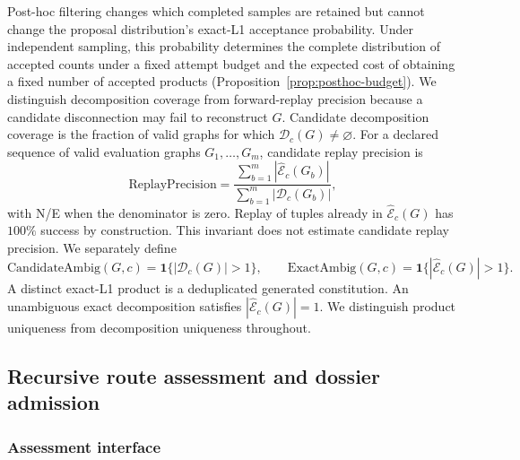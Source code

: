 \documentclass{article}
\theoremstyle{definition}
\begin{document}
Post-hoc filtering changes which completed samples are retained but cannot change the proposal
distribution's exact-L1 acceptance probability.
Under independent sampling, this probability determines the complete distribution of accepted
counts under a fixed attempt budget and the expected cost of obtaining a fixed number of accepted
products (Proposition~\ref{prop:posthoc-budget}).
We distinguish decomposition coverage from forward-replay precision because a candidate disconnection
may fail to reconstruct $G$.
Candidate decomposition coverage is the fraction of valid graphs for which
$\mathcal D_c(G)\neq\varnothing$. For a declared sequence of valid evaluation graphs $G_1,\ldots,G_m$, candidate replay precision is
\begin{equation}
 \mathrm{ReplayPrecision}
 =\frac{\sum_{b=1}^m|\widehat{\mathcal E}_c(G_b)|}
 {\sum_{b=1}^m|\mathcal D_c(G_b)|},
\end{equation}
with N/E when the denominator is zero. Replay of tuples already in
$\widehat{\mathcal E}_c(G)$ has $100\%$ success by construction. This invariant does not estimate
candidate replay precision. We separately define
\begin{equation}
 \mathrm{CandidateAmbig}(G,c)=\mathbf 1\{|\mathcal D_c(G)|>1\},\qquad
 \mathrm{ExactAmbig}(G,c)=\mathbf 1\{|\widehat{\mathcal E}_c(G)|>1\}.
\end{equation}
A distinct exact-L1 product is a deduplicated generated constitution. An unambiguous exact
decomposition satisfies $|\widehat{\mathcal E}_c(G)|=1$. We distinguish product uniqueness from
decomposition uniqueness throughout.

\subsection{Recursive route assessment and dossier admission}
\label{app:route-assessment}

\subsubsection{Assessment interface}
\end{document}
